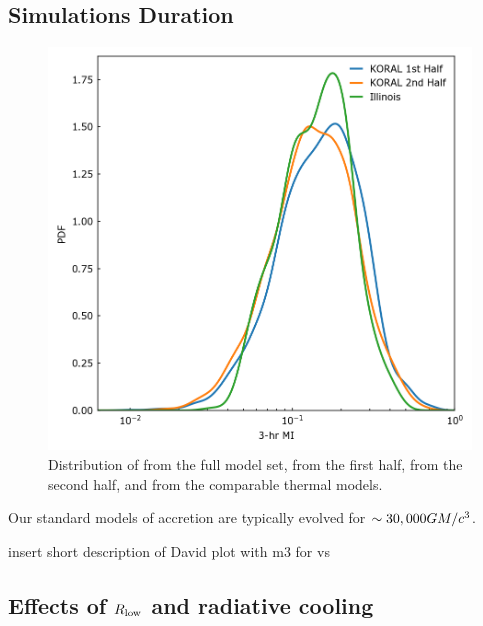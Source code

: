


\subsection{Simulations Duration}\label{app:narayan}

\begin{figure}
  \centering
  \includegraphics[width=\columnwidth]{./figures/Koral_vs_IL_MI.png}
  \caption{Distribution of  from the full \koral model set, from the first half, from the second half, and from the comparable \kharma thermal models.}
  \label{fig:koral_MI}
\end{figure}  

Our standard models of accretion are typically evolved for $\sim 30,000 GM/c^3$.   

insert short description of David plot with m3 for \koral vs \kharma

\subsection{Effects of $R_\mathrm{low}$ and radiative cooling}

